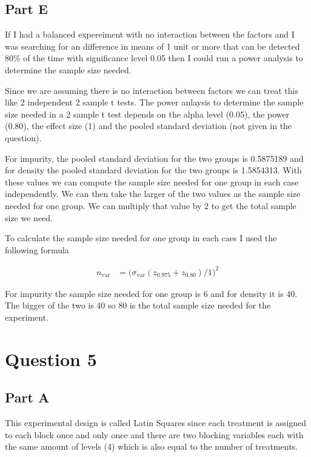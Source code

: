 \documentclass[]{book}
\begin{document}
\hypertarget{part-e-2}{%
\section{Part E}\label{part-e-2}}

If I had a balanced expereiment with no interaction between the factors and I was searching for an difference in means of 1 unit or more that can be detected 80\% of the time with significance level 0.05 then I could run a power analysis to determine the sample size needed.

Since we are assuming there is no interaction between factors we can treat this like 2 independent 2 sample t tests. The power anlaysis to determine the sample size needed in a 2 sample t test depends on the alpha level (0.05), the power (0.80), the effect size (1) and the pooled standard deviation (not given in the question).

For impurity, the pooled standard deviation for the two groups is 0.5875189 and for density the pooled standard deviation for the two groups is 1.5854313. With these values we can compute the sample size needed for one group in each case independently. We can then take the larger of the two values as the sample size needed for one group. We can multiply that value by 2 to get the total sample size we need.

To calculate the sample size needed for one group in each caes I used the following formula

\begin{align}
  n_{\text{var}} &= \bigg( \sigma_{\text{var}} (z_{0.975} + z_{0.80} ) / 1 \bigg)^2
\end{align}

For impurity the sample size needed for one group is 6 and for density it is 40. The bigger of the two is 40 so 80 is the total sample size needed for the experiment.

\hypertarget{question-5}{%
\chapter{Question 5}\label{question-5}}

\hypertarget{part-a-4}{%
\section{Part A}\label{part-a-4}}

This experimental design is called Latin Squares since each treatment is assigned to each block once and only once and there are two blocking variables each with the same amount of levels (4) which is also equal to the number of treatments.
\end{document}
